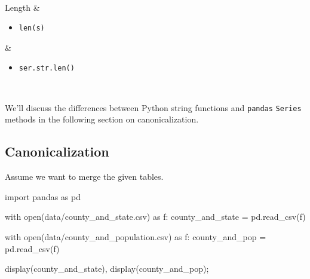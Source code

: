 \documentclass[
  letterpaper,
  DIV=11,
  numbers=noendperiod]{scrreprt}
\newenvironment{Shaded}{\begin{snugshade}}{\end{snugshade}}
\newcommand{\BuiltInTok}[1]{\textcolor[rgb]{0.00,0.23,0.31}{#1}}
\newcommand{\ControlFlowTok}[1]{\textcolor[rgb]{0.00,0.23,0.31}{#1}}
\newcommand{\ImportTok}[1]{\textcolor[rgb]{0.00,0.46,0.62}{#1}}
\newcommand{\NormalTok}[1]{\textcolor[rgb]{0.00,0.23,0.31}{#1}}
\newcommand{\OperatorTok}[1]{\textcolor[rgb]{0.37,0.37,0.37}{#1}}
\newcommand{\StringTok}[1]{\textcolor[rgb]{0.13,0.47,0.30}{#1}}
\providecommand{\tightlist}{%
  \setlength{\itemsep}{0pt}\setlength{\parskip}{0pt}}\usepackage{longtable,booktabs,array}
\begin{document}
\begin{longtable}[]
\begin{minipage}[t]{\linewidth}
\end{minipage} \\
Length & \begin{minipage}[t]{\linewidth}\raggedright
\begin{itemize}
\tightlist
\item
  \texttt{len(s)}
\end{itemize}
\end{minipage} & \begin{minipage}[t]{\linewidth}\raggedright
\begin{itemize}
\tightlist
\item
  \texttt{ser.str.len()}
\end{itemize}
\end{minipage} \\
\end{longtable}

We'll discuss the differences between Python string functions and
\texttt{pandas} \texttt{Series} methods in the following section on
canonicalization.

\subsection{Canonicalization}\label{canonicalization}

Assume we want to merge the given tables.

\begin{Shaded}
\begin{Highlighting}[]
\ImportTok{import}\NormalTok{ pandas }\ImportTok{as}\NormalTok{ pd}

\ControlFlowTok{with} \BuiltInTok{open}\NormalTok{(}\StringTok{\textquotesingle{}data/county\_and\_state.csv\textquotesingle{}}\NormalTok{) }\ImportTok{as}\NormalTok{ f:}
\NormalTok{    county\_and\_state }\OperatorTok{=}\NormalTok{ pd.read\_csv(f)}
    
\ControlFlowTok{with} \BuiltInTok{open}\NormalTok{(}\StringTok{\textquotesingle{}data/county\_and\_population.csv\textquotesingle{}}\NormalTok{) }\ImportTok{as}\NormalTok{ f:}
\NormalTok{    county\_and\_pop }\OperatorTok{=}\NormalTok{ pd.read\_csv(f)}
\end{Highlighting}
\end{Shaded}

\begin{Shaded}
\begin{Highlighting}[]
\NormalTok{display(county\_and\_state), display(county\_and\_pop)}\OperatorTok{;}
\end{Highlighting}
\end{Shaded}
\end{document}
